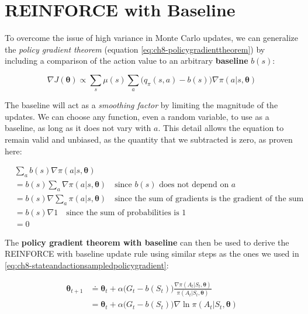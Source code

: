 \section{REINFORCE with Baseline}
To overcome the issue of high variance in Monte Carlo updates, we can generalize the \textit{policy gradient theorem} (equation \ref{eq:ch8-policygradienttheorem}) by including a comparison of the action value to an arbitrary \textbf{baseline} $b(s)$:

\begin{equation}
    \nabla J(\boldsymbol{\theta}) \propto \sum_s \mu(s) \sum_a \big(q_\pi(s,a) - b(s) \big) \nabla\pi(a \vert s, \boldsymbol{\theta})
    \label{eq:ch8-policygradienttheoremwithbaseline}
\end{equation}

The baseline will act as a \textit{smoothing factor} by limiting the magnitude of the updates. We can choose any function, even a random variable, to use as a baseline, as long as it does not vary with $a$. This detail allows the equation to remain valid and unbiased, as the quantity that we subtracted is zero, as proven here:

\begin{equation}
    \begin{split}
        & \sum_a b(s) \nabla\pi (a \vert s,\boldsymbol{\theta}) \\
        &= b(s) \sum_a \nabla\pi (a \vert s,\boldsymbol{\theta}) \quad \text{since } b(s) \text{ does not depend on } a\\
        &= b(s) \nabla \sum_a \pi (a \vert s,\boldsymbol{\theta}) \quad \text{since the sum of gradients is the gradient of the sum}\\
        &= b(s) \nabla 1 \quad \text{since the sum of probabilities is 1} \\
        &= 0
    \end{split}
    \label{eq:ch8-policygradientwithbaselineunbiasedproof}
\end{equation}

The \textbf{policy gradient theorem with baseline} can then be used to derive the REINFORCE with baseline update rule using similar steps as the ones we used in \ref{eq:ch8-stateandactionsampledpolicygradient}:

\begin{equation}
    \begin{split}
        \boldsymbol{\theta}_{t+1} &\doteq \boldsymbol{\theta}_t + \alpha \big(G_t - b(S_t) \big) \frac{\nabla \pi (A_t \vert S_t, \boldsymbol{\theta})}{\pi (A_t \vert S_t, \boldsymbol{\theta})} \\
        &= \boldsymbol{\theta}_t + \alpha \big( G_t - b(S_t) \big) \nabla \ln{\pi (A_t \vert S_t, \boldsymbol{\theta})}
    \end{split}
    \label{eq:ch8-reinforcewithbaselineupdaterule}
\end{equation}

